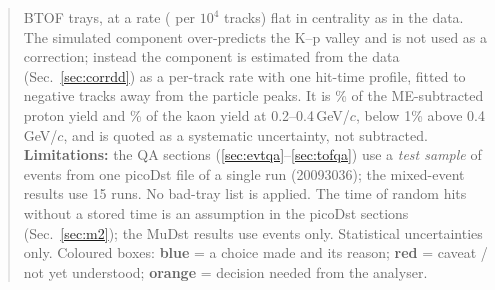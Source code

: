 \begin{abstract}
BTOF trays, at a rate (\simCorrA{} per $10^4$ tracks) flat in centrality as in the data. The simulated component over-predicts the K--p valley
and is not used as a correction; instead the component is estimated from the data (Sec.~\ref{sec:corrdd}) as a per-track rate with one
hit-time profile, fitted to negative tracks away from the particle peaks. It is \cddpAllA\% of the ME-subtracted proton yield and
\cddKAllA\% of the kaon yield at 0.2--0.4\,GeV/$c$, below 1\% above 0.4\,GeV/$c$, and is quoted as a systematic uncertainty, not
subtracted.
\textbf{Limitations:} the QA sections (\ref{sec:evtqa}--\ref{sec:tofqa}) use a \emph{test sample} of \nProcEvents{} events from one
picoDst file of a single run (20093036); the mixed-event results use 15 runs. No bad-tray list is applied.
The time of random hits without a stored time is an assumption in the picoDst sections (Sec.~\ref{sec:m2}); the MuDst
results use \ovEvMtwo{} events only. Statistical uncertainties only.
Coloured boxes: \textcolor{blue!60!black}{\textbf{blue}} = a choice made and its reason;
\textcolor{red!70!black}{\textbf{red}} = caveat / not yet understood;
\textcolor{orange!80!black}{\textbf{orange}} = decision needed from the analyser.
\end{abstract}
